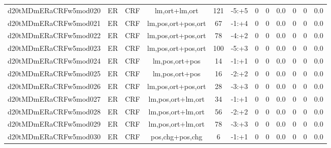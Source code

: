 \documentclass[a4paper]{article}
\begin{document}
\begin{landscape}
\begin{center}
\begin{tabular}{ |c|c|c|c|c|c|c|c|c|c|c|c|}
 
 	
 	\small{ d20tMDmERaCRFw5mod020 } & ER & CRF & lm,ort+lm,ort  &  121 &  -5:+5  &  0 & 0 & 0.0  &  0 & 0 & 0.0 \\
 	

 
 	
 	\small{ d20tMDmERaCRFw5mod021 } & ER & CRF & lm,pos,ort+pos,ort  &  67 &  -1:+4  &  0 & 0 & 0.0  &  0 & 0 & 0.0 \\
 	

 
 	
 	\small{ d20tMDmERaCRFw5mod022 } & ER & CRF & lm,pos,ort+pos,ort  &  78 &  -4:+2  &  0 & 0 & 0.0  &  0 & 0 & 0.0 \\
 	

 
 	
 	\small{ d20tMDmERaCRFw5mod023 } & ER & CRF & lm,pos,ort+pos,ort  &  100 &  -5:+3  &  0 & 0 & 0.0  &  0 & 0 & 0.0 \\
 	

 
 	
 	\small{ d20tMDmERaCRFw5mod024 } & ER & CRF & lm,pos,ort+pos  &  14 &  -1:+1  &  0 & 0 & 0.0  &  0 & 0 & 0.0 \\
 	

 
 	
 	\small{ d20tMDmERaCRFw5mod025 } & ER & CRF & lm,pos,ort+pos  &  16 &  -2:+2  &  0 & 0 & 0.0  &  0 & 0 & 0.0 \\
 	

 
 	
 	\small{ d20tMDmERaCRFw5mod026 } & ER & CRF & lm,pos,ort+pos,ort  &  28 &  -3:+3  &  0 & 0 & 0.0  &  0 & 0 & 0.0 \\
 	

 
 	
 	\small{ d20tMDmERaCRFw5mod027 } & ER & CRF & lm,pos,ort+lm,ort  &  34 &  -1:+1  &  0 & 0 & 0.0  &  0 & 0 & 0.0 \\
 	

 
 	
 	\small{ d20tMDmERaCRFw5mod028 } & ER & CRF & lm,pos,ort+lm,ort  &  56 &  -2:+2  &  0 & 0 & 0.0  &  0 & 0 & 0.0 \\
 	

 
 	
 	\small{ d20tMDmERaCRFw5mod029 } & ER & CRF & lm,pos,ort+lm,ort  &  78 &  -3:+3  &  0 & 0 & 0.0  &  0 & 0 & 0.0 \\
 	

 
 	
 	\small{ d20tMDmERaCRFw5mod030 } & ER & CRF & pos,chg+pos,chg  &  6 &  -1:+1  &  0 & 0 & 0.0  &  0 & 0 & 0.0 \\
 	


\end{tabular}
\end{center}
\end{landscape}
\end{document}
